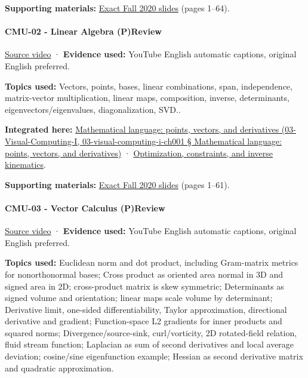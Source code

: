 \textbf{Supporting materials:} \href{https://15462.courses.cs.cmu.edu/fall2020content/lectures/01_intro/01_intro_slides.pdf}{Exact Fall 2020 slides} (pages 1--64).

\paragraph{CMU-02 - Linear Algebra (P)Review}\label{cmu-02---linear-algebra-preview}

\href{https://www.youtube.com/watch?v=2c8XQlQApx8}{Source video} · \textbf{Evidence used:} YouTube English automatic captions, original English preferred.

\textbf{Topics used:} Vectors, points, bases, linear combinations, span, independence, matrix-vector multiplication, linear maps, composition, inverse, determinants, eigenvectors/eigenvalues, diagonalization, SVD..

\textbf{Integrated here:} \href{}{Mathematical language: points, vectors, and derivatives (03-Visual-Computing-I, 03-visual-computing-i-ch001 § Mathematical language: points, vectors, and derivatives)} · \hyperref[04-visual-computing-ii-ch029]{Optimization, constraints, and inverse kinematics}.

\textbf{Supporting materials:} \href{https://15462.courses.cs.cmu.edu/fall2020content/lectures/02_linearalgebra/02_linearalgebra_slides.pdf}{Exact Fall 2020 slides} (pages 1--61).

\paragraph{CMU-03 - Vector Calculus (P)Review}\label{cmu-03---vector-calculus-preview}

\href{https://www.youtube.com/watch?v=O7Bec2uX3ZQ}{Source video} · \textbf{Evidence used:} YouTube English automatic captions, original English preferred.

\textbf{Topics used:} Euclidean norm and dot product, including Gram-matrix metrics for nonorthonormal bases; Cross product as oriented area normal in 3D and signed area in 2D; cross-product matrix is skew symmetric; Determinants as signed volume and orientation; linear maps scale volume by determinant; Derivative limit, one-sided differentiability, Taylor approximation, directional derivative and gradient; Function-space L2 gradients for inner products and squared norms; Divergence/source-sink, curl/vorticity, 2D rotated-field relation, fluid stream function; Laplacian as sum of second derivatives and local average deviation; cosine/sine eigenfunction example; Hessian as second derivative matrix and quadratic approximation.

